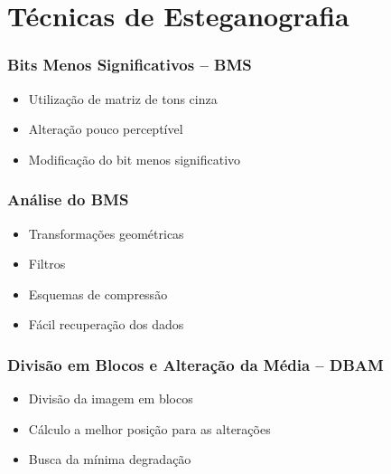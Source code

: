 \documentclass{beamer}
\begin{document}
\section{Técnicas de Esteganografia}
\begin{frame}
\frametitle{Bits Menos Significativos -- BMS}

\begin{itemize}
\item Utilização de matriz de tons cinza\newline
\item Alteração pouco perceptível\newline
\item Modificação do bit menos significativo

\end{itemize}

\end{frame}
\begin{frame}
\frametitle{Análise do BMS}

\begin{itemize}
\item Transformações geométricas\newline
\item Filtros\newline
\item Esquemas de compressão\newline
\item Fácil recuperação dos dados
\end{itemize}

\end{frame}
\begin{frame}
\frametitle{Divisão em Blocos e Alteração da Média -- DBAM}

\begin{itemize}
\item Divisão da imagem em blocos \newline
\item Cálculo a melhor posição para as alterações\newline
\item Busca da mínima degradação 
\end{itemize}
\end{frame}
\end{document}
